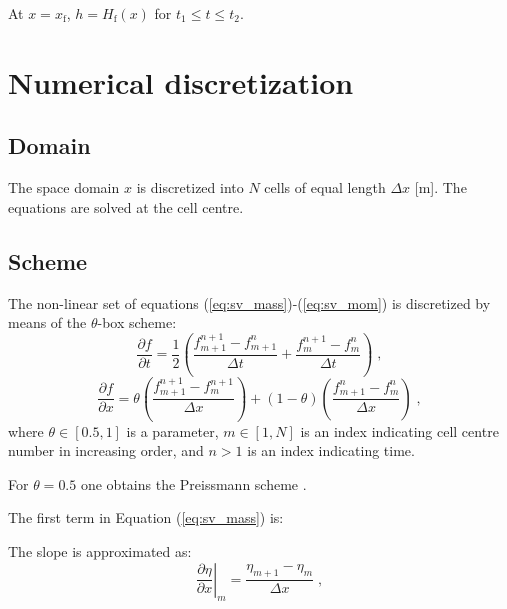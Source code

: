 \documentclass{deltares_report_elv}
\newcommand{\mathsub}[2]{#1_{\mathrm{#2}}}
\begin{document}
At $x=\mathsub{x}{f}$, $h=\mathsub{H}{f}(x)$ for $\mathsub{t}{1}\leq t \leq\mathsub{t}{2}$.

\section{Numerical discretization}

\subsection{Domain}

The space domain $x$ is discretized into $N$ cells of equal length $\Delta x$ [\si{m}]. The equations are solved at the cell centre. 

\subsection{Scheme}

The non-linear set of equations (\ref{eq:sv_mass})-(\ref{eq:sv_mom}) is discretized by means of the $\theta$-box scheme:
\begin{equation}
\frac{\partial f}{\partial t}=\frac{1}{2}\left(\frac{f_{m+1}^{n+1}-f_{m+1}^{n}}{\Delta t}+\frac{f_{m}^{n+1}-f_{m}^{n}}{\Delta t}\right) \;,
\end{equation}
\begin{equation}
\frac{\partial f}{\partial x}=\theta\left(\frac{f_{m+1}^{n+1}-f_{m}^{n+1}}{\Delta x}\right)+\left(1-\theta\right)\left(\frac{f_{m+1}^{n}-f_{m}^{n}}{\Delta x}\right) \;,
\end{equation}
where $\theta\in[0.5,1]$ is a parameter, $m\in[1,N]$ is an index indicating cell centre number in increasing order, and $n>1$ is an index indicating time. 

For $\theta=0.5$ one obtains the Preissmann scheme \citep{Preissmann61_2,Preissmann61_3,Lyn87_2}.

The first term in Equation (\ref{eq:sv_mass}) is:
\begin{equation}

\end{equation}

The slope is approximated as:
\begin{equation}
\left.\frac{\partial \eta}{\partial x}\right|_{m}=\frac{\eta_{m+1}-\eta_{m}}{\Delta x} \;,
\end{equation}



\end{document}
